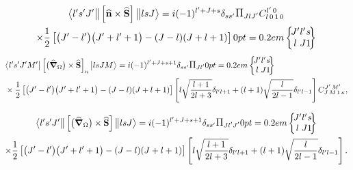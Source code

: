 \begin{multline*}
\braOketred{l^{\prime} s^{\prime} J^{\prime}}{\left[\widehat{\vect{n}} \times\widehat{\vect{S}}\right]}{l s J}
=i(-1)^{l^{\prime}+J+s} \delta_{ss'} \Fact{J l J^{\prime}}
\clebsch{l}{0}{1}{0}{l^{\prime}}{0} \\
\times \frac{1}{2}\left[\bigl(J^{\prime}-l^{\prime}\bigr)\bigl(J^{\prime}+l^{\prime}+1\bigr)-(J-l)(J+l+1)\right]
\sixj{J^{\prime}}{l^{\prime}}{s}{l}{J}{1}
\end{multline*}
\begin{align}
& 
\braOket{ l^{\prime} s^{\prime} J^{\prime} M^{\prime}}{\left[\bigl(\delop_{\Omega}\bigr) \times \widehat{\vect{S}}\right]_{\kappa}}{l s J M}=i(-1)^{l^{\prime}+J+s+1} \delta_{s s^{\prime}} \Fact{J l^\prime}
\sixj{J^{\prime}}{l^{\prime}}{s}{l}{J}{1} \notag\\
& \times \frac{1}{2}\left[\bigl(J^{\prime}-l^{\prime}\bigr)\bigl(J^{\prime}+l^{\prime}+1\bigr)-(J-l)(J+l+1)\right]\left[l \sqrt{\frac{l+1}{2 l+3}} \delta_{l^{\prime} l+1}+(l+1) \sqrt{\frac{l}{2 l-1}} \delta_{l^{\prime} l-1}\right]
\clebsch{J}{M}{1}{\kappa}{J^{\prime}}{M^{\prime}},  \label{eq:13:2:170}
\end{align}

\begin{multline*}
\braOketred{ l^{\prime} s^{\prime} J^{\prime}}{\left[\bigl(\delop_{\Omega}\bigr) \times \widehat{\vect{S}}\right]}{l s J}=i(-1)^{l^{\prime}+J+s+1} \delta_{s s^{\prime}} \Fact{J l^\prime J^{\prime}}
\sixj{J^{\prime}}{l^{\prime}}{s}{l}{J}{1} \\
\times \frac{1}{2}\left[\bigl(J^{\prime}-l^{\prime}\bigr)\bigl(J^{\prime}+l^{\prime}+1\bigr)-(J-l)(J+l+1)\right]\left[l \sqrt{\frac{l+1}{2 l+3}} \delta_{l^{\prime} l+1}+(l+1) \sqrt{\frac{l}{2 l-1}} \delta_{l^{\prime} l-1}\right].
\end{multline*}

